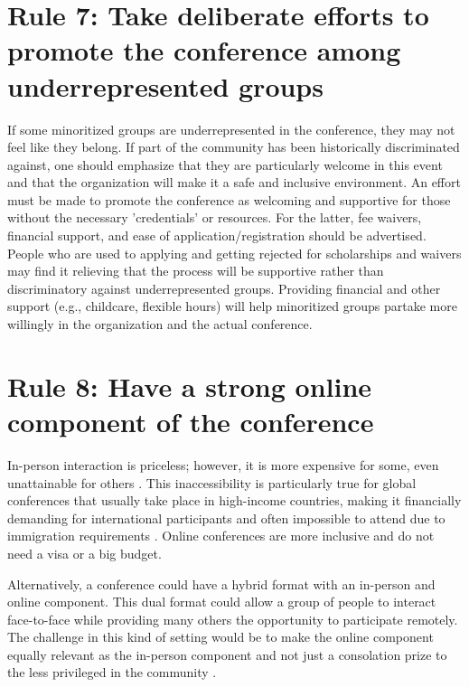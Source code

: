 \documentclass[10pt,letterpaper]{article}
\begin{document}
\section*{Rule 7: Take deliberate efforts to promote the conference among underrepresented groups}

If some minoritized groups are underrepresented in the conference, they may not feel like they belong. 
If part of the community has been historically discriminated against, one should emphasize that they are particularly welcome in this event and that the organization will make it a safe and inclusive environment. 
An effort must be made to promote the conference as welcoming and supportive for those without the necessary 'credentials' or resources. For the latter, fee waivers, financial support, and ease of application/registration should be advertised. People who are used to applying and getting rejected for scholarships and waivers may find it relieving that the process will be supportive rather than discriminatory against underrepresented groups. Providing financial and other support (e.g., childcare, flexible hours) will help minoritized groups partake more willingly in the organization and the actual conference.

\section*{Rule 8: Have a strong online component of the conference} 

In-person interaction is priceless; however, it is more expensive for some, even unattainable for others \cite{arend_disparity_2019, timperley_he_2020, niner_better_2021}. This inaccessibility is particularly true for global conferences that usually take place in high-income countries, making it financially demanding for international participants and often impossible to attend due to immigration requirements \cite{sarabipour_evaluating_2020, gewin_what_2019}. Online conferences are more inclusive and do not need a visa or a big budget.

Alternatively, a conference could have a hybrid format with an in-person and online component. This dual format could allow a group of people to interact face-to-face while providing many others the opportunity to participate remotely. The challenge in this kind of setting would be to make the online component equally relevant as the in-person component and not just a consolation prize to the less privileged in the community \cite{niner_better_2021}. 
\end{document}
